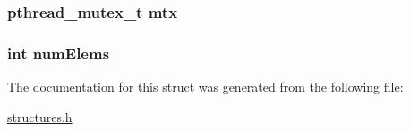 \subsubsection[{\texorpdfstring{mtx}{mtx}}]{\setlength{\rightskip}{0pt plus 5cm}pthread\+\_\+mutex\+\_\+t mtx}\hypertarget{struct_s_a___v_e_h_i_c_l_e___q_u_e_u_e_a2680f9fe5653a596c7e779b838180fdc}{}\label{struct_s_a___v_e_h_i_c_l_e___q_u_e_u_e_a2680f9fe5653a596c7e779b838180fdc}
\subsubsection[{\texorpdfstring{num\+Elems}{numElems}}]{\setlength{\rightskip}{0pt plus 5cm}int num\+Elems}\hypertarget{struct_s_a___v_e_h_i_c_l_e___q_u_e_u_e_ab9fc9205a1dbcc638f9a9f928d8c857d}{}\label{struct_s_a___v_e_h_i_c_l_e___q_u_e_u_e_ab9fc9205a1dbcc638f9a9f928d8c857d}


The documentation for this struct was generated from the following file\+:\begin{DoxyCompactItemize}
\item 
\hyperlink{structures_8h}{structures.\+h}\end{DoxyCompactItemize}
